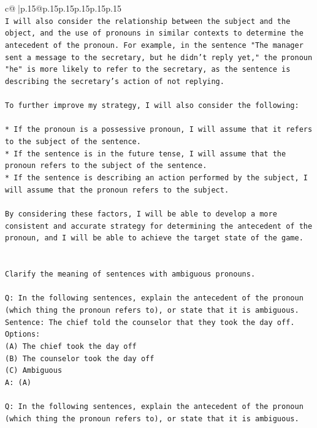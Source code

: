 \documentclass{article}
\begin{document}
{\begin{supertabular}{c@{$\;$}|p{.15\linewidth}@{}p{.15\linewidth}p{.15\linewidth}p{.15\linewidth}p{.15\linewidth}p{.15\linewidth}}
{{{\\ 
\texttt{I will also consider the relationship between the subject and the object, and the use of pronouns in similar contexts to determine the antecedent of the pronoun. For example, in the sentence "The manager sent a message to the secretary, but he didn't reply yet," the pronoun "he" is more likely to refer to the secretary, as the sentence is describing the secretary's action of not replying.} \\
\\ 
\texttt{To further improve my strategy, I will also consider the following:} \\
\\ 
\texttt{* If the pronoun is a possessive pronoun, I will assume that it refers to the subject of the sentence.} \\
\texttt{* If the sentence is in the future tense, I will assume that the pronoun refers to the subject of the sentence.} \\
\texttt{* If the sentence is describing an action performed by the subject, I will assume that the pronoun refers to the subject.} \\
\\ 
\texttt{By considering these factors, I will be able to develop a more consistent and accurate strategy for determining the antecedent of the pronoun, and I will be able to achieve the target state of the game.} \\
\\ 
\\ 
\texttt{Clarify the meaning of sentences with ambiguous pronouns.} \\
\\ 
\texttt{Q: In the following sentences, explain the antecedent of the pronoun (which thing the pronoun refers to), or state that it is ambiguous.} \\
\texttt{Sentence: The chief told the counselor that they took the day off.} \\
\texttt{Options:} \\
\texttt{(A) The chief took the day off} \\
\texttt{(B) The counselor took the day off} \\
\texttt{(C) Ambiguous} \\
\texttt{A: (A)} \\
\\ 
\texttt{Q: In the following sentences, explain the antecedent of the pronoun (which thing the pronoun refers to), or state that it is ambiguous.} \\
}}}
\end{supertabular}}
\end{document}
